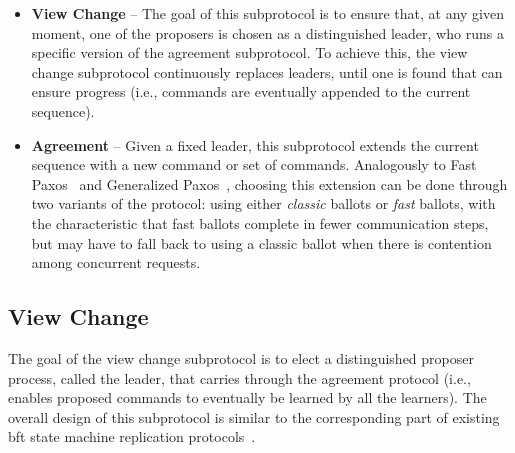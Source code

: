 \begin{itemize}
	
	\item
	{\bf View Change} -- The goal of this subprotocol is to ensure that, at any given moment, one of the proposers is chosen as a distinguished leader, who runs a specific version of the agreement subprotocol. To achieve this, the view change subprotocol continuously replaces leaders, until one is found that can ensure progress (i.e., commands are eventually appended to the current sequence).
	
	\item
	{\bf Agreement} -- Given a fixed leader, this subprotocol extends the current sequence with a new command or set of commands. Analogously to Fast Paxos~\cite{Lamport2006} and Generalized Paxos~\cite{Lamport2005}, choosing this extension can be done through two variants of the protocol: using either \textit{classic} ballots or \textit{fast} ballots, with the characteristic that fast ballots complete in fewer communication steps, but may have to fall back to using a classic ballot when there is contention among concurrent requests.
	
\end{itemize}

\subsection{View Change} 

The goal of the view change subprotocol is to elect a distinguished proposer process, called the leader, that carries through the agreement protocol (i.e., enables proposed commands to eventually be learned by all the learners). The overall design of this subprotocol is similar to the corresponding part of existing \acrshort{bft} state machine replication protocols~\cite{Castro1999}.\par

